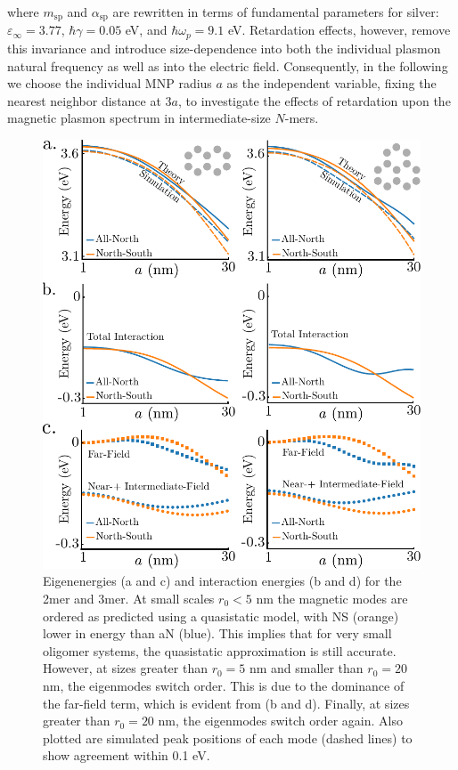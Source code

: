 \documentclass[journal=apchd5,manuscript=article]{achemso}
\begin{document}
\noindent where $m_{\textrm{sp}}$ and $\alpha_{\textrm{sp}}$ are rewritten in terms of fundamental parameters for silver: $\varepsilon_{\infty} = 3.77$, $\hbar\gamma = 0.05$ eV, and $\hbar\omega_{p} = 9.1$ eV. Retardation effects, however, remove this invariance and introduce size-dependence into both the individual plasmon natural frequency as well as into the electric field. Consequently, in the following we choose the individual MNP radius $a$ as the independent variable, fixing the nearest neighbor distance at 3$a$, to investigate the effects of retardation upon the magnetic plasmon spectrum in intermediate-size $N$-mers.

\begin{figure}
\includegraphics{2mer-3mer-eig.pdf}
\caption{Eigenenergies (a and c) and interaction energies (b and d) for the 2mer and 3mer. At small scales $r_0 < 5$ nm the magnetic modes are ordered as predicted using a quasistatic model, with NS (orange) lower in energy than aN (blue). This implies that for very small oligomer systems, the quasistatic approximation is still accurate. However, at sizes greater than $r_0 = 5$ nm and smaller than $r_0 = 20$ nm, the eigenmodes switch order. This is due to the dominance of the far-field term, which is evident from (b and d). Finally, at sizes greater than $r_0 = 20$ nm, the eigenmodes switch order again. Also plotted are simulated peak positions of each mode (dashed lines) to show agreement within 0.1 eV.}
\label{scaling}
\end{figure}
\end{document}
